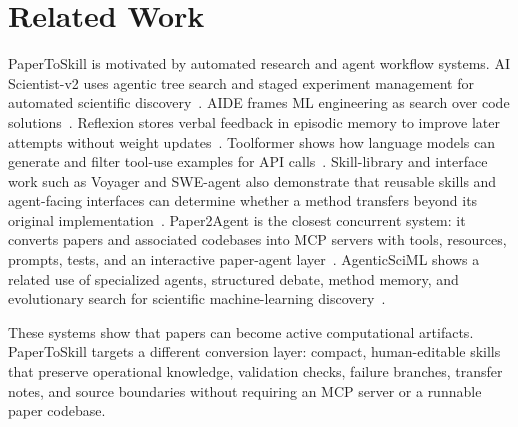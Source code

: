 \section{Related Work}

PaperToSkill is motivated by automated research and agent workflow systems.
AI Scientist-v2 uses agentic tree search and staged experiment management for
automated scientific discovery~\cite{lu2025aiscientistv2}. AIDE frames ML
engineering as search over code solutions~\cite{aide2025}. Reflexion stores
verbal feedback in episodic memory to improve later attempts without weight
updates~\cite{shinn2023reflexion}. Toolformer shows how language models can
generate and filter tool-use examples for API calls~\cite{schick2023toolformer}.
Skill-library and interface work such as Voyager and SWE-agent also demonstrate
that reusable skills and agent-facing interfaces can determine whether a method
transfers beyond its original implementation~\cite{wang2023voyager,yang2024sweagent}.
Paper2Agent is the closest concurrent system: it converts papers and associated
codebases into MCP servers with tools, resources, prompts, tests, and an
interactive paper-agent layer~\cite{miao2025paper2agent}. AgenticSciML shows a
related use of specialized agents, structured debate, method memory, and
evolutionary search for scientific machine-learning discovery~\cite{jiang2026agenticsciml}.

These systems show that papers can become active computational artifacts.
PaperToSkill targets a different conversion layer: compact, human-editable
skills that preserve operational knowledge, validation checks, failure branches,
transfer notes, and source boundaries without requiring an MCP server or a
runnable paper codebase.
